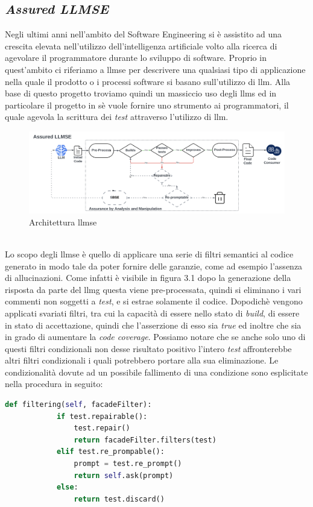     \subsection{\textit{Assured LLMSE}}
    Negli ultimi anni nell'ambito del Software Engineering si è assistito ad una crescita elevata nell'utilizzo dell'intelligenza artificiale volto alla ricerca di agevolare il programmatore durante lo sviluppo di software.
    Proprio in quest'ambito ci riferiamo a \gls{llmse} per descrivere una qualsiasi tipo di applicazione nella quale il prodotto o i processi software si basano sull'utilizzo di \gls{llm}\cite{article:Alshahwan2024AssuredLS}.
    Alla base di questo progetto troviamo quindi un massiccio uso degli \glspl{llm} ed in particolare il progetto in sè vuole fornire uno strumento ai programmatori, il quale agevola la scrittura dei \textit{test} attraverso l'utilizzo di \gls{llm}.
    \begin{figure}[!h]
        \centering        
        \includegraphics[width=14.5cm]{img/LLMSE.png}
        \caption{Architettura \gls{llmse}\cite{article:Alshahwan2024AssuredLS}}
    \end{figure}
  \\Lo scopo degli \gls{llmse} è quello di applicare una serie di filtri semantici al codice generato in modo tale da poter fornire delle garanzie, come ad esempio l'assenza di allucinazioni.
    Come infatti è visibile in figura 3.1 dopo la generazione della risposta da parte del \gls{llmg} questa viene pre-processata, quindi si eliminano i vari commenti non soggetti a \textit{test}, e si estrae solamente il codice.
    Dopodichè vengono applicati svariati filtri, tra cui la capacità di essere nello stato di \textit{build}, di essere in stato di accettazione, quindi che l'asserzione di esso sia \textit{true} ed inoltre che sia in grado di aumentare la \textit{code coverage}.
    Possiamo notare che se anche solo uno di questi filtri condizionali non desse risultato positivo l'intero \textit{test} affronterebbe altri filtri condizionali i quali potrebbero portare alla sua eliminazione.
    Le condizionalità dovute ad un possibile fallimento di una condizione sono esplicitate nella procedura in seguito:
    \begin{lstlisting}[language=Python]
        def filtering(self, facadeFilter):
            if test.repairable():
                test.repair()
                return facadeFilter.filters(test)
            elif test.re_prompable():
                prompt = test.re_prompt()
                return self.ask(prompt)
            else:
                return test.discard()
    \end{lstlisting}
    
